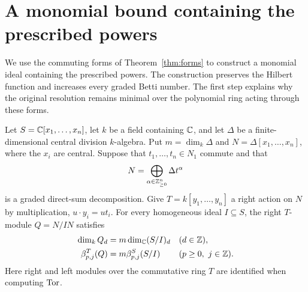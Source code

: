 \section{A monomial bound containing the prescribed powers}
\label{sec:monomial}

We use the commuting forms of Theorem~\ref{thm:forms} to construct a
monomial ideal containing the prescribed powers.  The construction
preserves the Hilbert function and increases every graded Betti number.
The first step explains why the original resolution remains minimal
over the polynomial ring acting through these forms.

\begin{lemma}
\label{mono:transfer}
Let $S=\mathbb C[x_1,\ldots,x_n]$, let $k$ be a field containing $\mathbb C$, and
let $\Delta$ be a finite-dimensional central division $k$-algebra.
Put $m=\dim_k\Delta$ and
$N=\Delta[x_1,\ldots,x_n]$, where the $x_i$ are central.
Suppose that $t_1,\ldots,t_n\in N_1$ commute and that
\begin{equation}
          N=\bigoplus_{\alpha\in\mathbb Z_{\geq0}^n}\Delta t^\alpha
 \label{mono:basis}
\end{equation}
is a graded direct-sum decomposition.  Give
$T=k[y_1,\ldots,y_n]$ a right action on $N$ by multiplication,
$u\cdot y_i=ut_i$.
For every homogeneous ideal $I\subseteq S$, the right $T$-module
$Q=N/IN$ satisfies
\begin{align}
 \dim_k Q_d&=m\dim_\mathbb C(S/I)_d
          &&(d\in\mathbb Z),\label{mono:dimension-transfer}\\
 \beta^T_{p,j}(Q)&=m\beta^S_{p,j}(S/I)
          &&(p\geq0,\ j\in\mathbb Z).
          \label{mono:betti-transfer}
\end{align}
Here right and left modules over the commutative ring $T$ are
identified when computing $\operatorname{Tor}$.
\end{lemma}

